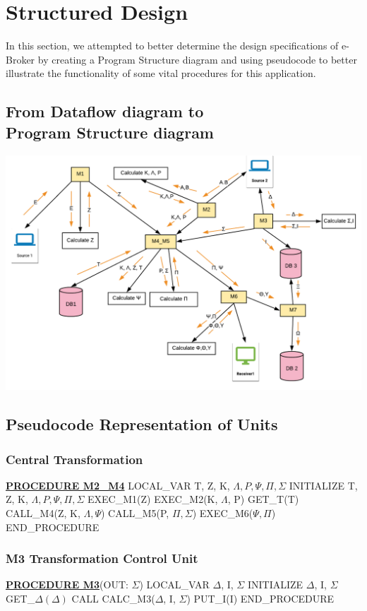 \documentclass{article}
\begin{document}
\section{Structured Design}
In this section, we attempted to better determine the design specifications of e-Broker by creating a Program Structure diagram and using pseudocode to better illustrate the functionality of some vital procedures for this application. 
\subsection{From Dataflow diagram to{\\} Program Structure diagram}
\includegraphics[scale=0.6]{program-structure}

\subsection{Pseudocode Representation of Units}

\subsubsection{Central Transformation}
\begin{algorithmic}[H]
\STATE \underline{\textbf{PROCEDURE M2\_M4}}
	\STATE LOCAL\_VAR T, Z, K, $\Lambda, P, \Psi, \Pi, \Sigma$ 
	\STATE INITIALIZE T, Z, K, $\Lambda, P, \Psi, \Pi, \Sigma$ 
	\STATE EXEC\_M1(Z)
	\STATE EXEC\_M2(K, $\Lambda$, P)
	\STATE GET\_T(T)
	\STATE CALL\_M4(Z, K, $\Lambda, \Psi$)
	\STATE CALL\_M5(P, $\Pi, \Sigma$)
	\STATE EXEC\_M6($\Psi, \Pi$)
\STATE END\_PROCEDURE
\end{algorithmic}

\subsubsection{M3 Transformation Control Unit}
\begin{algorithmic}[H]
\STATE \underline{\textbf{PROCEDURE M3}}(OUT: $\Sigma$)
	\STATE LOCAL\_VAR $\Delta$, I, $\Sigma$
	\STATE INITIALIZE $\Delta$, I, $\Sigma$ 
	\STATE GET\_$\Delta(\Delta)$
	\STATE CALL CALC\_M3($\Delta$, I, $\Sigma$)
	\STATE PUT\_I(I)
\STATE END\_PROCEDURE
\end{algorithmic}
\end{document}
